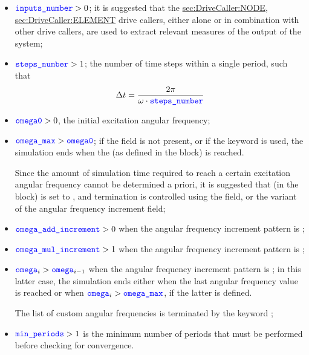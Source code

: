 \begin{itemize}
\item $\textcolor{blue}{\texttt{inputs\_number}} > 0$; it is suggested that the
\hyperref{\kw{node}}{\kw{node} (see Section~}{)}{sec:DriveCaller:NODE},
\hyperref{\kw{element}}{\kw{element} (see Section~}{)}{sec:DriveCaller:ELEMENT}
drive callers, either alone or in combination with other drive callers, are used to extract relevant measures of the output of the system;

\item $\textcolor{blue}{\texttt{steps\_number}} > 1$; the number of time steps within a single period, such that
\begin{align*}
	\Delta t = \frac{2 \pi}{\omega \cdot \textcolor{blue}{\texttt{steps\_number}}}
\end{align*}

\item $\textcolor{blue}{\texttt{omega0}} > 0$, the initial excitation angular frequency;

\item $\textcolor{blue}{\texttt{omega\_max}} > \textcolor{blue}{\texttt{omega0}}$; if the  field is not present, or if the keyword  is used, the simulation ends when the  (as defined in the  block) is reached.

Since the amount of simulation time required to reach a certain excitation angular frequency cannot be determined a priori, it is suggested that  (in the  block) is set to , and termination is controlled using the  field, or the  variant of the angular frequency increment field;

\item $\textcolor{blue}{\texttt{omega\_add\_increment}} > 0$ when the angular frequency increment pattern is ;

\item $\textcolor{blue}{\texttt{omega\_mul\_increment}} > 1$ when the angular frequency increment pattern is ;

\item $\textcolor{blue}{\texttt{omega}}_i > \textcolor{blue}{\texttt{omega}}_{i-1}$ when the angular frequency increment pattern is ; in this latter case, the simulation ends either when the last angular frequency value is reached or when $\textcolor{blue}{\texttt{omega}}_i > \textcolor{blue}{\texttt{omega\_max}}$, if the latter is defined.

The list of custom angular frequencies is terminated by the keyword ;

\item $\textcolor{blue}{\texttt{min\_periods}} > 1$ is the minimum number of periods that must be performed before checking for convergence.


\end{itemize}
